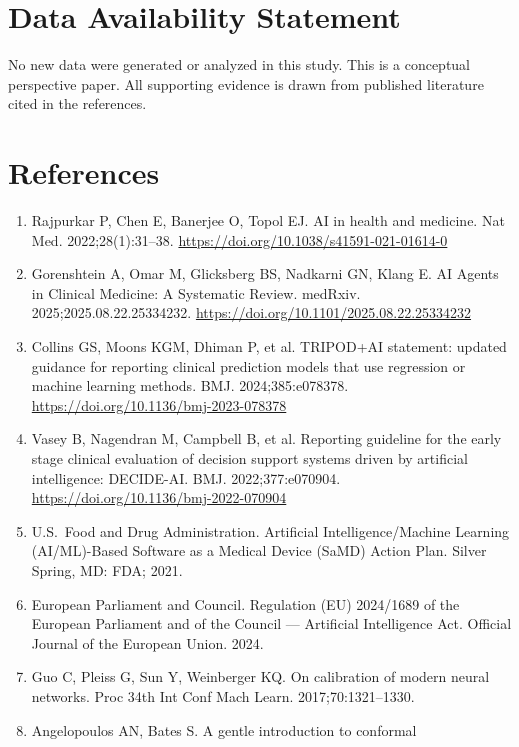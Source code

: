 \section*{Data Availability Statement}\label{data-availability-statement}

No new data were generated or analyzed in this study. This is a
conceptual perspective paper. All supporting evidence is drawn from
published literature cited in the references.



\section*{References}\label{references}

\begin{enumerate}
\def\labelenumi{\arabic{enumi}.}
\item
  Rajpurkar P, Chen E, Banerjee O, Topol EJ. AI in health and medicine.
  Nat Med. 2022;28(1):31--38.
  \url{https://doi.org/10.1038/s41591-021-01614-0}
\item
  Gorenshtein A, Omar M, Glicksberg BS, Nadkarni GN, Klang E. AI Agents
  in Clinical Medicine: A Systematic Review. medRxiv.
  2025;2025.08.22.25334232.
  \url{https://doi.org/10.1101/2025.08.22.25334232}
\item
  Collins GS, Moons KGM, Dhiman P, et al. TRIPOD+AI statement: updated
  guidance for reporting clinical prediction models that use regression
  or machine learning methods. BMJ. 2024;385:e078378.
  \url{https://doi.org/10.1136/bmj-2023-078378}
\item
  Vasey B, Nagendran M, Campbell B, et al. Reporting guideline for the
  early stage clinical evaluation of decision support systems driven by
  artificial intelligence: DECIDE-AI. BMJ. 2022;377:e070904.
  \url{https://doi.org/10.1136/bmj-2022-070904}
\item
  U.S.\ Food and Drug Administration. Artificial Intelligence/Machine
  Learning (AI/ML)-Based Software as a Medical Device (SaMD) Action
  Plan. Silver Spring, MD: FDA; 2021.
\item
  European Parliament and Council. Regulation (EU) 2024/1689 of the
  European Parliament and of the Council --- Artificial Intelligence
  Act. Official Journal of the European Union. 2024.
\item
  Guo C, Pleiss G, Sun Y, Weinberger KQ. On calibration of modern neural
  networks. Proc 34th Int Conf Mach Learn. 2017;70:1321--1330.
\item
  Angelopoulos AN, Bates S. A gentle introduction to conformal

\end{enumerate}
